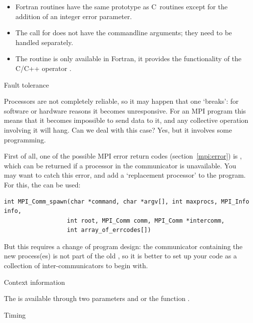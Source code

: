 \begin{itemize}
\item Fortran routines have the same prototype as C~routines except for the addition
  of an integer error parameter.
\item The call for  does not have the commandline arguments;
  they need to be handled separately.
\item The routine  is only available in Fortran, it provides the 
  functionality of the C/C++ operator .
\end{itemize}


 {Fault tolerance}
\label{mpi:tolerant}

Processors are not completely reliable, so it may happen that one
`breaks': for software or hardware reasons it becomes
unresponsive. For an MPI program this means that it becomes impossible
to send data to it, and any collective operation involving it will
hang. Can we deal with this case? Yes, but it involves some
programming.

First of all, one of the possible MPI error return codes
(section~\ref{mpi:error}) is , which can be returned
if a processor in the communicator is unavailable. You may want to
catch this error, and add a `replacement processor' to the
program. For this, the  can be used:
\begin{verbatim}
int MPI_Comm_spawn(char *command, char *argv[], int maxprocs, MPI_Info info, 
                  int root, MPI_Comm comm, MPI_Comm *intercomm,
                  int array_of_errcodes[])
\end{verbatim}
But this requires a change of program design: the communicator
containing the new process(es) is not part of the
old , so it is better to set up your code as a
collection of inter-communicators to begin with.

 {Context information}

The  is available through two parameters
 and 
or the function .

 {Timing}

